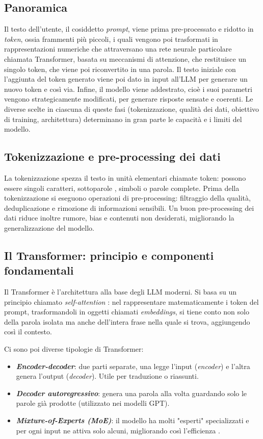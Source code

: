 \subsection{Panoramica}
Il testo dell'utente, il cosiddetto \textit{prompt}, viene prima pre-processato e ridotto in \textit{token}, ossia frammenti più piccoli,
i quali vengono poi trasformati in rappresentazioni numeriche che attraversano una rete neurale particolare chiamata Transformer, basata
su meccanismi di attenzione, che restituisce un singolo token, che viene poi riconvertito in una parola. Il testo iniziale con l'aggiunta del token
generato viene poi dato in input all'LLM per generare un nuovo token e così via. Infine, il modello viene addestrato, cioè i suoi parametri vengono
strategicamente modificati, per generare risposte sensate e coerenti.
Le diverse scelte in ciascuna di queste fasi (tokenizzazione, qualità dei dati, obiettivo di training, architettura)
determinano in gran parte le capacità e i limiti del modello.

\subsection{Tokenizzazione e pre-processing dei dati}
La tokenizzazione \cite{webster1992tokenization} spezza il testo in unità elementari chiamate token: possono essere singoli caratteri,
sottoparole \cite{kudo2018subword}, simboli \cite{sennrich2016neural} o parole complete. Prima della tokenizzazione
si eseguono operazioni di pre-processing: filtraggio della qualità, deduplicazione e rimozione di informazioni sensibili.
Un buon pre-processing dei dati riduce inoltre rumore, bias e contenuti non desiderati, migliorando la generalizzazione del modello.

\subsection{Il Transformer: principio e componenti fondamentali}
Il Transformer è l'architettura alla base degli LLM moderni. Si basa su un principio chiamato \textit{self-attention} \cite{vaswani2017attention}:
nel rappresentare matematicamente i token del prompt, trasformandoli in oggetti chiamati \textit{embeddings}, si tiene conto non solo della parola
isolata ma anche dell'intera frase nella quale si trova, aggiungendo così il contesto.

Ci sono poi diverse tipologie di Transformer:
\begin{itemize}
    \item \textbf{\textit{Encoder-decoder}}: due parti separate, una legge l'input (\textit{encoder}) e l'altra genera l'output (\textit{decoder}).
    Utile per traduzione o riassunti.
    \item \textbf{\textit{Decoder autoregressivo}}: genera una parola alla volta guardando solo le parole già prodotte (utilizzato nei modelli GPT).
    \item \textbf{\textit{Mixture-of-Experts (MoE)}}: il modello ha molti "esperti" specializzati e per ogni input ne attiva solo alcuni,
    migliorando così l'efficienza \cite{fedus2022switch}\cite{du2022glam}\cite{ren2023pangu-p}.
\end{itemize}

